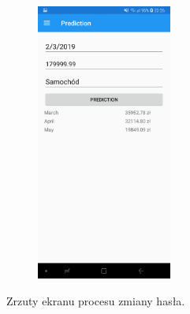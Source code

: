 \begin{figure}[!ht]
\begin{center}
\begin{subfigure}[b]{0.3\textwidth}
			\label{predykcja}
		\end{subfigure}
		\begin{subfigure}[b]{0.3\textwidth}
			\includegraphics[width=1.75in]{img/mobile/predykcja_gotowe.jpg}
			\label{predykcja_gotowe}
		\end{subfigure}
	\end{center}
	\caption{Zrzuty ekranu procesu zmiany hasła.}
\end{figure}